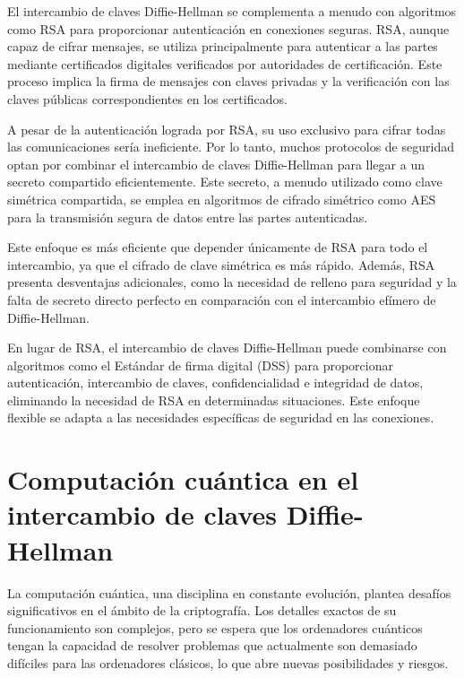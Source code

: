 \documentclass[11pt]{article}
\begin{document}
El intercambio de claves Diffie-Hellman se complementa a menudo con algoritmos como RSA para proporcionar autenticación en conexiones seguras. RSA, aunque capaz de cifrar mensajes, se utiliza principalmente para autenticar a las partes mediante certificados digitales verificados por autoridades de certificación. Este proceso implica la firma de mensajes con claves privadas y la verificación con las claves públicas correspondientes en los certificados.

A pesar de la autenticación lograda por RSA, su uso exclusivo para cifrar todas las comunicaciones sería ineficiente. Por lo tanto, muchos protocolos de seguridad optan por combinar el intercambio de claves Diffie-Hellman para llegar a un secreto compartido eficientemente. Este secreto, a menudo utilizado como clave simétrica compartida, se emplea en algoritmos de cifrado simétrico como AES para la transmisión segura de datos entre las partes autenticadas.

Este enfoque es más eficiente que depender únicamente de RSA para todo el intercambio, ya que el cifrado de clave simétrica es más rápido. Además, RSA presenta desventajas adicionales, como la necesidad de relleno para seguridad y la falta de secreto directo perfecto en comparación con el intercambio efímero de Diffie-Hellman.

En lugar de RSA, el intercambio de claves Diffie-Hellman puede combinarse con algoritmos como el Estándar de firma digital (DSS) para proporcionar autenticación, intercambio de claves, confidencialidad e integridad de datos, eliminando la necesidad de RSA en determinadas situaciones. Este enfoque flexible se adapta a las necesidades específicas de seguridad en las conexiones.


\section{Computación cuántica en el intercambio de claves Diffie-Hellman}

La computación cuántica, una disciplina en constante evolución, plantea desafíos significativos en el ámbito de la criptografía. Los detalles exactos de su funcionamiento son complejos, pero se espera que los ordenadores cuánticos tengan la capacidad de resolver problemas que actualmente son demasiado difíciles para las ordenadores clásicos, lo que abre nuevas posibilidades y riesgos.
\end{document}

